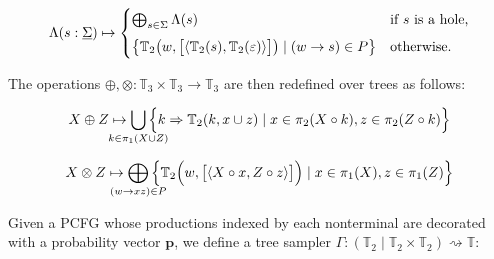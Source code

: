 \documentclass[portrait,a0b,final,a4resizeable]{a0poster}
\def\jointspacing{\vspace{0.3in}}
\begin{document}
\begin{poster}
\begin{multicols}{2}
      \[
           \Lambda(s: \underline\Sigma) \mapsto \begin{cases}
               \bigoplus_{s\in \Sigma} \Lambda(s) & \text{if $s$ is a hole,} \vspace{5pt}\\
               \big\{\mathbb{T}_2\big(w, \big[\langle\mathbb{T}_2(s), \mathbb{T}_2(\varepsilon)\rangle\big]\big) \mid (w \rightarrow s)\in P\big\} & \text{otherwise.}
           \end{cases}
      \]
%
      \hspace*{2cm}\begin{minipage}[c]{0.90\columnwidth}
      The operations $\oplus, \otimes: \mathbb{T}_3 \times \mathbb{T}_3 \rightarrow \mathbb{T}_3$ are then redefined over trees as follows:
      \end{minipage}

      \[
          X \oplus Z \mapsto \bigcup_{\mathclap{k\in \pi_1(X \cup Z)}}\Big\{k \Rightarrow \mathbb{T}_2(k, x \cup z) \mid x \in \pi_2(X\circ k), z \in \pi_2(Z\circ k)\Big\}
      \]

      \[
        X \otimes Z \mapsto \bigoplus_{\mathclap{(w\rightarrow xz) \in P}}\Big\{\mathbb{T}_2\Big(w, \big[\langle X\circ x, Z\circ z\rangle\big]\Big) \mid x \in \pi_1(X), z \in \pi_1(Z)\Big\}
      \]
%

      \vspace{-0.5cm}
      \jointspacing


      \jointspacing

      \hspace*{2cm}\begin{minipage}[c]{0.90\columnwidth}
      Given a PCFG whose productions indexed by each nonterminal are decorated with a probability vector $\mathbf{p}$, we define a tree sampler $\Gamma: (\mathbb{T}_2 \mid \mathbb{T}_2\times\mathbb{T}_2) \rightsquigarrow \mathbb{T}$:
      \end{minipage}


\end{multicols}
\end{poster}
\end{document}
